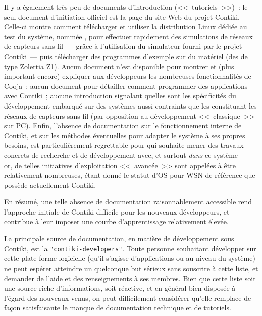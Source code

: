 Il y a également très peu de documents d'introduction (<<~tutoriels~>>)~:
le seul document d'initiation officiel est la page  du
site Web du projet Contiki. Celle-ci montre comment télécharger et utiliser
la distribution Linux dédiée au test du système, nommée , pour effectuer rapidement des simulations de réseaux de capteurs
sans-fil~--- grâce à l'utilisation du simulateur  \cite{Cooja}
fourni par le projet Contiki~--- puis télécharger des programmes d'exemple
sur du matériel (des  de type Zolertia Z1). Aucun document n'est
disponible pour montrer et (plus important encore) expliquer aux
développeurs les nombreuses fonctionnalités de Cooja~; aucun document pour
détailler comment programmer des applications avec Contiki~; aucune
introduction signalant quelles sont les spécificités du développement
embarqué sur des systèmes aussi contraints que les  constituant
les réseaux de capteurs sans-fil (par opposition au développement
<<~classique~>> sur PC). Enfin, l'absence de documentation sur le
fonctionnement interne de Contiki, et sur les méthodes éventuelles
pour adapter le système à ses propres besoins, est particulièrement
regrettable pour qui souhaite mener des travaux concrets de recherche
et de développement avec, et surtout \emph{dans} ce système~--- or,
de telles initiatives d'exploitation <<~avancée~>> sont appelées
à être relativement nombreuses, étant donné le statut d'OS pour WSN
de référence que possède actuellement Contiki.

En résumé, une telle absence de documentation raisonnablement accessible
rend l'approche initiale de Contiki difficile pour les nouveaux développeurs,
et contribue à leur imposer une courbe d'apprentissage relativement élevée.

La principale source de documentation, en matière de développement sous
Contiki, est la 
\texttt{"contiki-developers"}\footnotemark[1].
Toute personne souhaitant développer sur cette plate-forme logicielle
(qu'il s'agisse d'applications ou au niveau du système) ne peut espérer
atteindre un quelconque but sérieux sans souscrire à cette liste, et
demander de l'aide et des renseignements à ses membres. Bien que cette
liste soit une source riche d'informations, soit réactive, et en
général bien disposée à l'égard des nouveaux venus, on peut difficilement
considérer qu'elle remplace de façon satisfaisante le manque de
documentation technique et de tutoriels.


